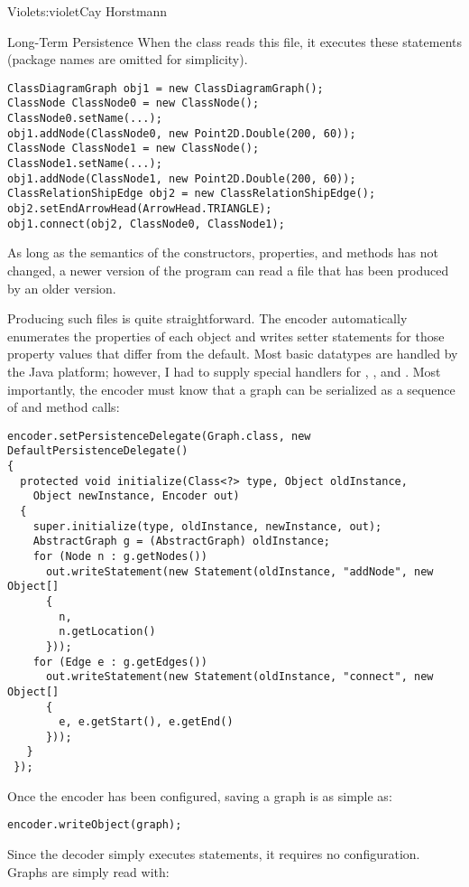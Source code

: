 \begin{aosachapter}{Violet}{s:violet}{Cay Horstmann}
\begin{aosasect1}{Long-Term Persistence}
When the  class reads this file, it executes these
statements (package names are omitted for simplicity).

\begin{verbatim}
ClassDiagramGraph obj1 = new ClassDiagramGraph();
ClassNode ClassNode0 = new ClassNode();
ClassNode0.setName(...);
obj1.addNode(ClassNode0, new Point2D.Double(200, 60));
ClassNode ClassNode1 = new ClassNode();
ClassNode1.setName(...);
obj1.addNode(ClassNode1, new Point2D.Double(200, 60));
ClassRelationShipEdge obj2 = new ClassRelationShipEdge();
obj2.setEndArrowHead(ArrowHead.TRIANGLE);
obj1.connect(obj2, ClassNode0, ClassNode1);
\end{verbatim}

As long as the semantics of the constructors, properties, and methods
has not changed, a newer version of the program can read a file that
has been produced by an older version.

Producing such files is quite straightforward. The encoder
automatically enumerates the properties of each object and writes
setter statements for those property values that differ from the
default. Most basic datatypes are handled by the Java platform;
however, I had to supply special handlers for ,
, and . Most importantly,
the encoder must know that a graph can be serialized as a sequence of
 and  method calls:

\begin{verbatim}
encoder.setPersistenceDelegate(Graph.class, new DefaultPersistenceDelegate()
{
  protected void initialize(Class<?> type, Object oldInstance, 
    Object newInstance, Encoder out)
  {
    super.initialize(type, oldInstance, newInstance, out);
    AbstractGraph g = (AbstractGraph) oldInstance;
    for (Node n : g.getNodes())
      out.writeStatement(new Statement(oldInstance, "addNode", new Object[]
      {
        n, 
        n.getLocation()
      }));
    for (Edge e : g.getEdges())
      out.writeStatement(new Statement(oldInstance, "connect", new Object[]
      {
        e, e.getStart(), e.getEnd()
      }));
   } 
 });
\end{verbatim}

Once the encoder has been configured, saving a graph is as simple as:

\begin{verbatim}
encoder.writeObject(graph);
\end{verbatim}

\noindent Since the decoder simply executes statements, it requires no
configuration.  Graphs are simply read with:


\end{aosasect1}
\end{aosachapter}
